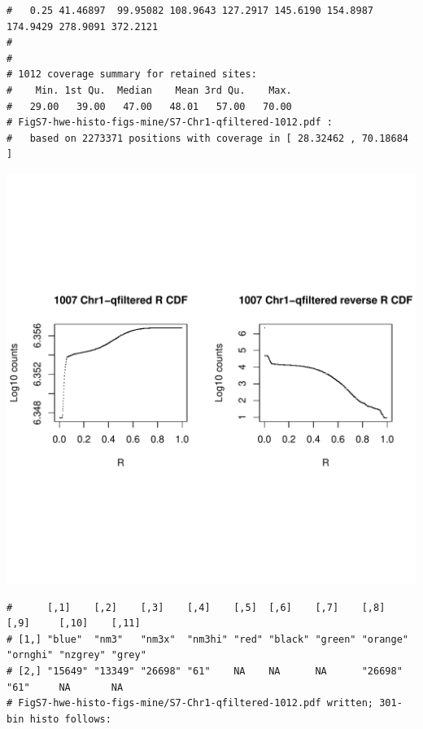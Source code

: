 \documentclass{article}\usepackage[]{graphicx}\usepackage[]{color}
\makeatletter
\def\maxwidth{ %
  \ifdim\Gin@nat@width>\linewidth
    \linewidth
  \else
    \Gin@nat@width
  \fi
}
\newenvironment{kframe}{%
 \def\at@end@of@kframe{}%
 \ifinner\ifhmode%
  \def\at@end@of@kframe{\end{minipage}}%
  \begin{minipage}{\columnwidth}%
 \fi\fi%
 \def\FrameCommand##1{\hskip\@totalleftmargin \hskip-\fboxsep
 \colorbox{shadecolor}{##1}\hskip-\fboxsep
     \hskip-\linewidth \hskip-\@totalleftmargin \hskip\columnwidth}%
 \MakeFramed {\advance\hsize-\width
   \@totalleftmargin\z@ \linewidth\hsize
   \@setminipage}}%
 {\par\unskip\endMakeFramed%
 \at@end@of@kframe}
\newenvironment{knitrout}{}{} %
\makeatother
\begin{document}
\begin{knitrout}
\begin{kframe}
\begin{verbatim}
#   0.25 41.46897  99.95082 108.9643 127.2917 145.6190 154.8987 174.9429 278.9091 372.2121
# 
# 
# 1012 coverage summary for retained sites:
#    Min. 1st Qu.  Median    Mean 3rd Qu.    Max. 
#   29.00   39.00   47.00   48.01   57.00   70.00 
# FigS7-hwe-histo-figs-mine/S7-Chr1-qfiltered-1012.pdf :
#   based on 2273371 positions with coverage in [ 28.32462 , 70.18684 ]
\end{verbatim}
\end{kframe}
\includegraphics[width=\maxwidth]{FigS7-hwe-histo-figs-knitr/unnamed-chunk-10-44} 
\begin{kframe}\begin{verbatim}
#      [,1]    [,2]    [,3]    [,4]    [,5]  [,6]    [,7]    [,8]     [,9]     [,10]    [,11] 
# [1,] "blue"  "nm3"   "nm3x"  "nm3hi" "red" "black" "green" "orange" "ornghi" "nzgrey" "grey"
# [2,] "15649" "13349" "26698" "61"    NA    NA      NA      "26698"  "61"     NA       NA    
# FigS7-hwe-histo-figs-mine/S7-Chr1-qfiltered-1012.pdf written; 301-bin histo follows:
\end{verbatim}
\end{kframe}

\end{knitrout}
\end{document}
